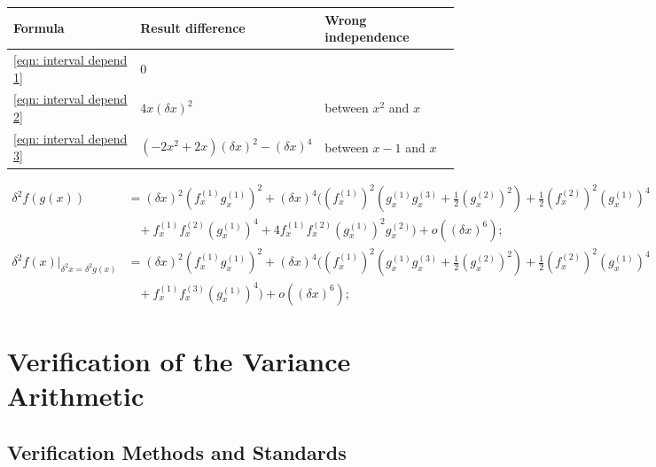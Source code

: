 \documentclass[twoside]{article}
\numberwithin{equation}{section}
\newcommand{\eqspace}{\;\;\;}
\begin{document}
\begin{table}
\label{eqn: dependency example}
\centering
\begin{tabular}{|l|l|l|} 
\hline 
Formula & Result difference & Wrong independence \\ 
\hline 
\eqref{eqn: interval depend 1} & $0$ & \\
\hline 
\eqref{eqn: interval depend 2} & $4 x (\delta x)^2$ & between $x^2$ and $x$ \\
\hline 
\eqref{eqn: interval depend 3} & $( - 2 x^2 + 2 x) (\delta x)^2 - (\delta x)^4$ & between $x-1$ and $x$ \\
\hline 
\end{tabular}
\end{table}

\begin{align}
\label{eqn: composite variance 1d}
\delta^2 f(g(x)) &= (\delta x)^2 (f^{(1)}_x g^{(1)}_x)^2 + (\delta x)^4
    ((f^{(1)}_x)^2 (g^{(1)}_x g^{(3)}_x + \frac{1}{2}(g^{(2)}_x)^2) + \frac{1}{2} (f^{(2)}_x)^2 (g^{(1)}_x)^4 \nonumber \\
  &\eqspace + f^{(1)}_x f^{(2)}_x (g^{(1)}_x)^4 + 4 f^{(1)}_x f^{(2)}_x (g^{(1)}_x)^2 g^{(2)}_x) + o((\delta x)^6); \\
\label{eqn: progressive variance}
\delta^2 f(x)|_{\delta^2 x = \delta^2 g(x)} &= (\delta x)^2 (f^{(1)}_x g^{(1)}_x)^2 + (\delta x)^4 
    ((f^{(1)}_x)^2 (g^{(1)}_x g^{(3)}_x + \frac{1}{2}(g^{(2)}_x)^2) + \frac{1}{2} (f^{(2)}_x)^2 (g^{(1)}_x)^4 \nonumber \\
  &\eqspace + f^{(1)}_x f^{(3)}_x (g^{(1)}_x)^4) + o((\delta x)^6) ; 
\end{align}



\clearpage
\section{Verification of the Variance Arithmetic}
\label{sec: validation}

\subsection{Verification Methods and Standards}
\end{document}
